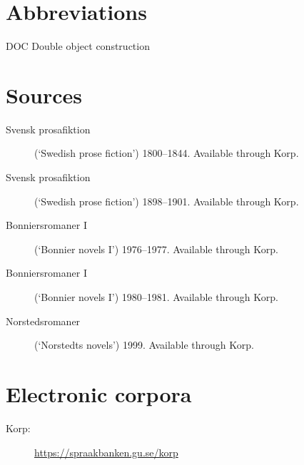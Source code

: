 \documentclass[output=paper]{langscibook}
\begin{document}
\section*{Abbreviations}


DOC  Double object construction


\section*{Sources}

\begin{description}
\item[Svensk prosafiktion] (`Swedish prose fiction') 1800–1844. Available through Korp.
\item[Svensk prosafiktion] (`Swedish prose fiction') 1898–1901. Available through Korp.
\item[Bonniersromaner I]   (`Bonnier novels I') 1976–1977. Available through Korp.
\item[Bonniersromaner I]   (`Bonnier novels I') 1980–1981. Available through Korp.
\item[Norstedsromaner]     (`Norstedts novels') 1999. Available through Korp.
\end{description}

\section*{Electronic corpora}

\begin{description}
\item[Korp:] \url{https://spraakbanken.gu.se/korp}
\end{description}

{\sloppy\printbibliography[heading=subbibliography,notkeyword=this]}
\end{document}
